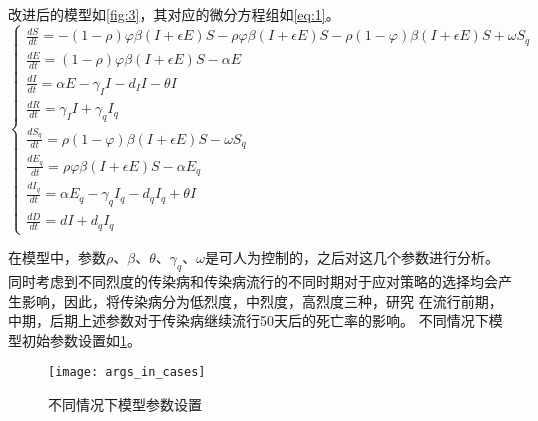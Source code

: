 \documentclass[withoutpreface,bwprint]{cumcmthesis}
\begin{document}
改进后的模型如\cref{fig:3}，其对应的微分方程组如\cref{eq:1}。
\begin{equation}
    \begin{cases}
        \frac{dS}{dt}=-(1-\rho)\varphi\beta(I+\epsilon E)S-\rho\varphi\beta(I+\epsilon E)S-\rho(1-\varphi)\beta(I+\epsilon E)S+\omega S_q \\
        \frac{dE}{dt}=(1-\rho)\varphi\beta(I+\epsilon E)S-\alpha E                                                                        \\
        \frac{dI}{dt}=\alpha E-\gamma_II-d_II-\theta I                                                                                    \\
        \frac{dR}{dt}=\gamma_II+\gamma_qI_q                                                                                               \\
        \frac{dS_q}{dt}=\rho(1-\varphi)\beta(I+\epsilon E)S-\omega S_q                                                                    \\
        \frac{dE_q}{dt}=\rho\varphi\beta(I+\epsilon E)S-\alpha E_q                                                                        \\
        \frac{dI_q}{dt}=\alpha E_q-\gamma_qI_q-d_qI_q+\theta I                                                                            \\
        \frac{dD}{dt}=dI+d_qI_q
    \end{cases}
    \label{eq:1}
\end{equation}

在模型中，参数$\rho$、$\beta$、$\theta$、$\gamma_q$、$\omega$是可人为控制的，之后对这几个参数进行分析。
同时考虑到不同烈度的传染病和传染病流行的不同时期对于应对策略的选择均会产生影响，因此，将传染病分为低烈度，中烈度，高烈度三种，研究
在流行前期，中期，后期上述参数对于传染病继续流行50天后的死亡率的影响。
不同情况下模型初始参数设置如\cref{fig:5}。

\begin{figure}[H]
    \centering
    \texttt{[image: args\_in\_cases]}
    \caption{不同情况下模型参数设置}
    \label{fig:5}
\end{figure}
\end{document}
